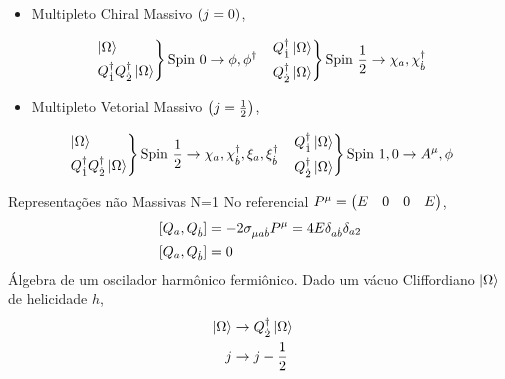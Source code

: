 \documentclass{beamer}
\begin{document}
\begin{frame}
    \begin{itemize}
        \item Multipleto Chiral Massivo $\qty(j=0)$,
    \end{itemize}
    \begin{align*}
        &\begin{rcases*}
            \ket\Omega\\
            Q_{\dot 1}^\dagger Q_{\dot 2}^\dagger\ket\Omega
        \end{rcases*}\textnormal{Spin }0\rightarrow \phi,\phi^\dagger
        &\begin{rcases*}
            Q_{\dot 1}^\dagger \ket\Omega\\
            Q_{\dot 2}^\dagger\ket\Omega
        \end{rcases*}\textnormal{Spin }\frac12\rightarrow \chi_a,\chi^\dagger_{\dot b}
    \end{align*}
    \begin{itemize}
        \item Multipleto Vetorial Massivo $\qty(j=\frac12)$,
    \end{itemize}
    \begin{align*}
        &\begin{rcases*}
            \ket\Omega\\
            Q_{\dot 1}^\dagger Q_{\dot 2}^\dagger\ket\Omega
        \end{rcases*}\textnormal{Spin }\frac12\rightarrow \chi_a,\chi^\dagger_{\dot b},\xi_a,\xi^\dagger_{\dot b}
        &\begin{rcases*}
            Q_{\dot 1}^\dagger \ket\Omega\\
            Q_{\dot 2}^\dagger\ket\Omega
        \end{rcases*}\textnormal{Spin }1,0\rightarrow A^\mu,\phi
    \end{align*}
\end{frame}

\begin{frame}{Representações não Massivas N=1}
    No referencial $P^\mu=\mqty(E&0&0&E)$,
    \begin{align*}
        \comm{Q_a}{Q_{\dot b}}&=-2\sigma_{\mu a\dot b}P^\mu=4E\delta_{a\dot b}\delta_{a2}\\
        \comm{Q_a}{Q_{\dot b}}&=0
    \end{align*}
    Álgebra de um oscilador harmônico fermiônico. Dado um vácuo Cliffordiano $\ket\Omega$ de 
    helicidade $h$,
    \begin{align*}
        \ket\Omega&\rightarrow Q_{\dot 2}^{\dagger}\ket\Omega&\\
        j&\rightarrow j-\frac12
    \end{align*}
\end{frame}
\end{document}
